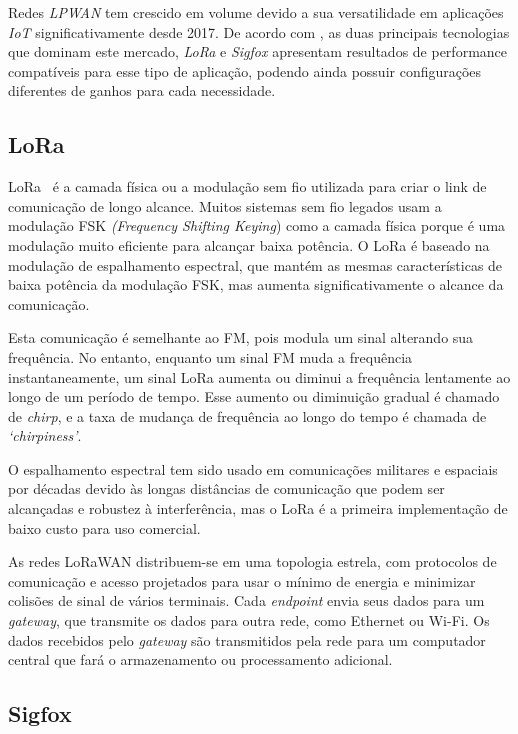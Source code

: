 Redes \textit{LPWAN} tem crescido em volume devido a sua versatilidade em aplicações \textit{IoT} significativamente desde 2017. De acordo com , as duas principais tecnologias que dominam este mercado, \textit{LoRa} e \textit{Sigfox} apresentam resultados de performance compatíveis para esse tipo de aplicação, podendo ainda possuir configurações diferentes de ganhos para cada necessidade.


\subsection{LoRa}
LoRa~\cite{LoRaAlliance} é a camada física ou a modulação sem fio utilizada para criar o link de comunicação de longo alcance. Muitos sistemas sem fio legados usam a modulação FSK \textit{(Frequency Shifting Keying}) como a camada física porque é uma modulação muito eficiente para alcançar baixa potência. O LoRa é baseado na modulação de espalhamento espectral, que mantém as mesmas características de baixa potência da modulação FSK, mas aumenta significativamente o alcance da comunicação. 

Esta comunicação é semelhante ao FM, pois modula um sinal alterando sua frequência. No entanto, enquanto um sinal FM muda a frequência instantaneamente, um sinal LoRa aumenta ou diminui a frequência lentamente ao longo de um período de tempo. Esse aumento ou diminuição gradual é chamado de \textit{chirp}, e a taxa de mudança de frequência ao longo do tempo é chamada de \textit{`chirpiness'}. 

O espalhamento espectral tem sido usado em comunicações militares e espaciais por décadas devido às longas distâncias de comunicação que podem ser alcançadas e robustez à interferência, mas o LoRa é a primeira implementação de baixo custo para uso comercial.

As redes LoRaWAN distribuem-se em uma topologia estrela, com protocolos de comunicação e acesso projetados para usar o mínimo de energia e minimizar colisões de sinal de vários terminais. Cada \textit{endpoint} envia seus dados para um \textit{gateway}, que transmite os dados para outra rede, como Ethernet ou Wi-Fi. Os dados recebidos pelo \textit{gateway} são transmitidos pela rede para um computador central que fará o armazenamento ou processamento adicional.
\subsection{Sigfox}

